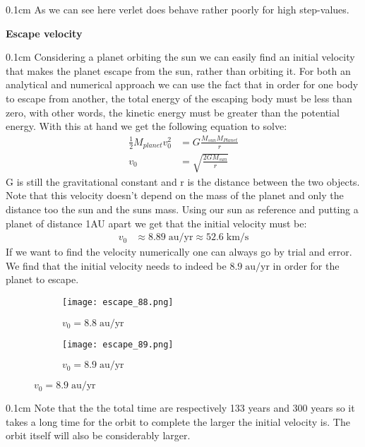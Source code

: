 \documentclass[11 pt, a4 paper]{article}
\newenvironment{tabbed}{\begin{addmargin}{0.1cm}}{\end{addmargin}}
\newcommand{\sectiontitle}[1]{\begin{center} \Large\textbf{{#1}} \end{center}}
\begin{document}
    \begin{tabbed}
        As we can see here verlet does behave rather poorly for high step-values.
    \end{tabbed}

\sectiontitle{Escape velocity}
    \begin{tabbed}
        Considering a planet orbiting the sun we can easily find an initial velocity that makes the planet escape from the sun, rather than orbiting it. For both an analytical and numerical approach we can use the fact that in order for one body to escape from another, the total energy of the escaping body must be less than zero, with other words, the kinetic energy must be greater than the potential energy. With this at hand we get the following equation to solve:
        \begin{align*}
            \frac{1}{2}M_{planet}v^2_0 &= G\frac{M_{sun}M_{Planet}}{r}\\
            v_0 &= \sqrt{\frac{2GM_{sun}}{r}}
        \end{align*}
        G is still the gravitational constant and r is the distance between the two objects. Note that this velocity doesn't depend on the mass of the planet and only the distance too the sun and the suns mass. Using our sun as reference and putting a planet of distance 1AU apart we get that the initial velocity must be:
        \begin{align*}
            v_0 &\approx 8.89\; \mbox{au/yr} \approx 52.6\; \mbox{km/s}
        \end{align*}
        If we want to find the velocity numerically one can always go by trial and error. We find that the initial velocity needs to indeed be $8.9\; \mbox{au/yr}$ in order for the planet to escape.
    \end{tabbed}
        \begin{figure}[H]
            \captionsetup[subfigure]{labelformat=empty}
            \begin{subfigure}[b!]{0.6\textwidth}
                \centering
                \texttt{[image: escape\_88.png]}
                \caption{$v_0=8.8\;\mbox{au/yr}$}
            \end{subfigure}
            \begin{subfigure}[b!]{0.6\textwidth}
                \texttt{[image: escape\_89.png]}
                \caption{$v_0=8.9\; \mbox{au/yr}$}
            \end{subfigure}
        \end{figure}
    \begin{tabbed}
        Note that the the total time are respectively 133 years and 300 years so it takes a long time for the orbit to complete the larger the initial velocity is. The orbit itself will also be considerably larger.
    \end{tabbed}
\end{document}
